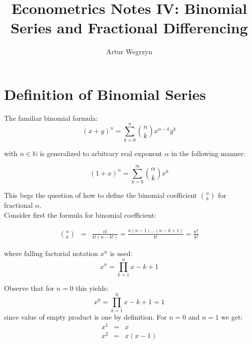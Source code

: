 \documentclass[12pt]{article}
\begin{document}
\title{Econometrics Notes IV: Binomial Series and Fractional Differencing}
\author{Artur Wegrzyn}
\maketitle



\tableofcontents

\section{Definition of Binomial Series}
The familiar binomial formula:
\begin{equation*}
(x+y)^n = \sum_{k=0}^{n} \binom{n}{k} x^{n-k} y^{k}
\end{equation*}

with $n \in \mathbb{N}$ is generalized to arbitrary 
real exponent $\alpha$ in the following manner:

\begin{equation}
(1 + x)^{\alpha} = \sum_{k=0}^{\infty} \binom{\alpha}{k} x^k
\end{equation}

This begs the question of how to define the binomial coefficient 
$\binom{\alpha}{k}$ for fractional $\alpha$. \\
\indent Consider first the formula for binomial coefficient:

\begin{eqnarray*}
\binom{n}{k} &=& \frac{n!}{k!(n-k!)} = \frac{n(n-1)\dots (n-k+1)}{k!} = \frac{n^{\underline{k}}}{k!}
\end{eqnarray*}

where falling factorial notation $x^{\underline{n}}$ is used:
\begin{equation*}
x^{\underline{n}} = \prod_{k=1}^{n} x - k + 1
\end{equation*}

Observe that for $n=0$ this yields:
\begin{equation*}
x^{\underline{0}} = \prod_{k=1}^{0}x - k + 1 = 1
\end{equation*}
since value of empty product is one by definition. For $n=0$ and $n=1$ we get:
\begin{eqnarray*}
x^{\underline{1}} &=& x \\
x^{\underline{2}} &=& x (x-1)
\end{eqnarray*}
 
\end{document}
